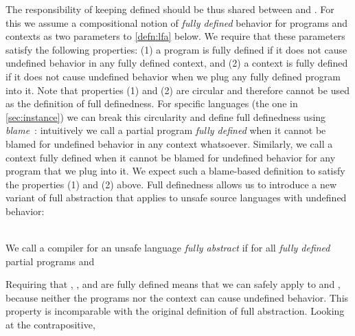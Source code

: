 \documentclass[10pt, conference, compsocconf, letterpaper, times]{IEEEtran}
\begin{document}
\label{sec:lfa}



The responsibility of keeping  defined should be thus shared
between  and .
For this we assume a compositional notion of {\em fully defined}
behavior for programs and contexts as two parameters to
\autoref{defn:lfa} below.
We require that these parameters satisfy the following properties: (1)
a program is fully defined if it does not cause undefined behavior in
any fully defined context, and (2) a context is fully defined if it
does not cause undefined behavior when we plug any fully defined
program into it.
Note that properties (1) and (2) are circular and therefore cannot be
used as the definition of full definedness.
For specific languages (\EG the one in \autoref{sec:instance}) we can
break this circularity and define full definedness using {\em
  blame}~\cite{FindlerF02prime}: intuitively we call a partial program
{\em fully defined} when it cannot be blamed for undefined behavior in
any context whatsoever.
Similarly, we call a context fully defined when it cannot be blamed
for undefined behavior for any program that we plug into it.
We expect such a blame-based definition to satisfy the properties (1)
and (2) above.
\ifsooner
{}
\fi
Full definedness allows us to introduce a new variant of
full abstraction that applies to unsafe source languages with
undefined behavior:





\begin{defn}\label{defn:lfa}~\\
  We call a compiler  for an unsafe language {\em fully
    abstract} if for all {\em fully defined} partial programs  and
  
\end{defn}

Requiring that , , and  are fully defined means that we can safely
apply  to  and , because neither the programs nor
the context can cause undefined behavior.
This property is incomparable with the original definition of full
abstraction.
Looking at the contrapositive,
\end{document}
